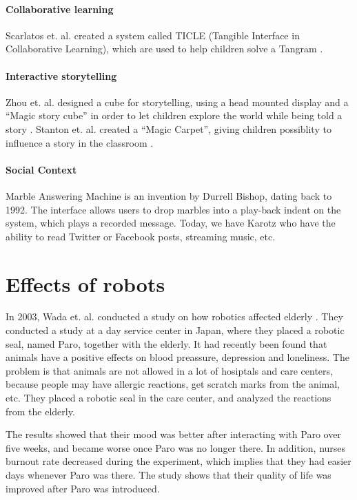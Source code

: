 \paragraph{Collaborative learning}
Scarlatos et. al. created a system called TICLE (Tangible Interface in Collaborative Learning), which are used to help children solve a Tangram \cite{scarlatos1999ticle}.  

\paragraph{Interactive storytelling}
Zhou et. al. designed a cube for storytelling, using a head mounted display and a ``Magic story cube'' in order to let children explore the world while being told a story \cite{zhou2004magic}. Stanton et. al. created a ``Magic Carpet'', giving children possiblity to influence a story in the classroom \cite{stanton2001classroom}. 
 
\paragraph{Social Context}
Marble Answering Machine is an invention by Durrell Bishop, dating back to 1992. The interface allows users to drop marbles into a play-back indent on the system, which plays a recorded message. Today, we have Karotz who have the ability to read Twitter or Facebook posts, streaming music, etc.   

\section{Effects of robots}

In 2003, Wada et. al. conducted a study on how robotics affected elderly \cite{wada2004effects}. They conducted a study at a day service center in Japan, where they placed a robotic seal, named Paro, together with the elderly. It had recently been found that animals have a positive effects on blood preassure, depression and loneliness. The problem is that animals are not allowed in a lot of hosiptals and care centers, because people may have allergic reactions, get scratch marks from the animal, etc. They placed a robotic seal in the care center, and analyzed the reactions from the elderly. 

The results showed that their mood was better after interacting with Paro over five weeks, and became worse once Paro was no longer there. In addition, nurses burnout rate decreased during the experiment, which implies that they had easier days whenever Paro was there. The study shows that their quality of life was improved after Paro was introduced.           


